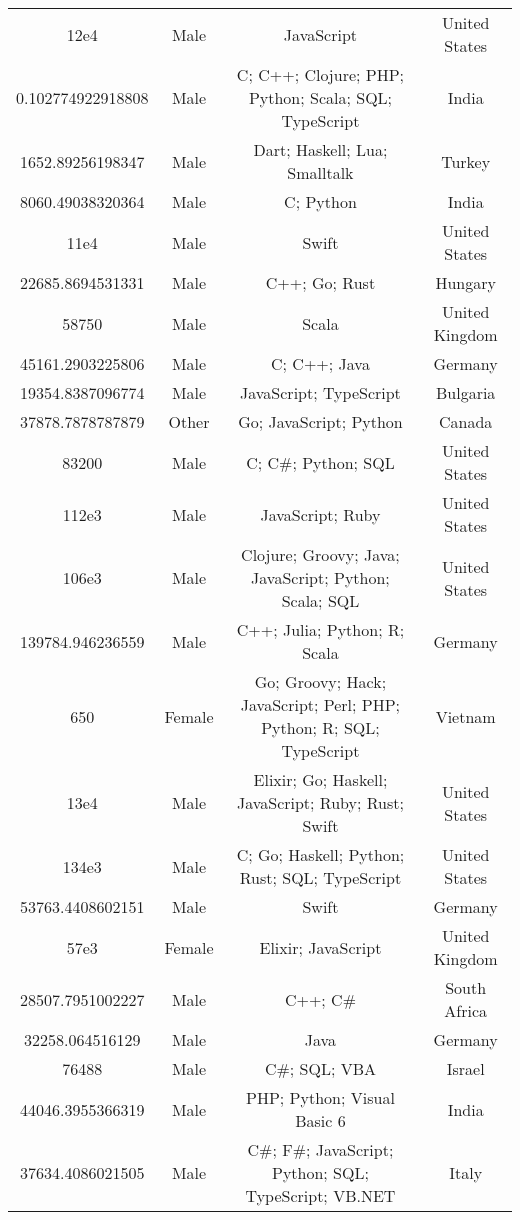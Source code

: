 \begin{center}
\begin{tabular}{ |c|c|c|c| }
12e4  &  Male  &  JavaScript  &  United States  \\ 
0.102774922918808  &  Male  &  C; C++; Clojure; PHP; Python; Scala; SQL; TypeScript  &  India  \\ 
1652.89256198347  &  Male  &  Dart; Haskell; Lua; Smalltalk  &  Turkey  \\ 
8060.49038320364  &  Male  &  C; Python  &  India  \\ 
11e4  &  Male  &  Swift  &  United States  \\ 
22685.8694531331  &  Male  &  C++; Go; Rust  &  Hungary  \\ 
58750  &  Male  &  Scala  &  United Kingdom  \\ 
45161.2903225806  &  Male  &  C; C++; Java  &  Germany  \\ 
19354.8387096774  &  Male  &  JavaScript; TypeScript  &  Bulgaria  \\ 
37878.7878787879  &  Other  &  Go; JavaScript; Python  &  Canada  \\ 
83200  &  Male  &  C; C\#; Python; SQL  &  United States  \\ 
112e3  &  Male  &  JavaScript; Ruby  &  United States  \\ 
106e3  &  Male  &  Clojure; Groovy; Java; JavaScript; Python; Scala; SQL  &  United States  \\ 
139784.946236559  &  Male  &  C++; Julia; Python; R; Scala  &  Germany  \\ 
650  &  Female  &  Go; Groovy; Hack; JavaScript; Perl; PHP; Python; R; SQL; TypeScript  &  Vietnam  \\ 
13e4  &  Male  &  Elixir; Go; Haskell; JavaScript; Ruby; Rust; Swift  &  United States  \\ 
134e3  &  Male  &  C; Go; Haskell; Python; Rust; SQL; TypeScript  &  United States  \\ 
53763.4408602151  &  Male  &  Swift  &  Germany  \\ 
57e3  &  Female  &  Elixir; JavaScript  &  United Kingdom  \\ 
28507.7951002227  &  Male  &  C++; C\#  &  South Africa  \\ 
32258.064516129  &  Male  &  Java  &  Germany  \\ 
76488  &  Male  &  C\#; SQL; VBA  &  Israel  \\ 
44046.3955366319  &  Male  &  PHP; Python; Visual Basic 6  &  India  \\ 
37634.4086021505  &  Male  &  C\#; F\#; JavaScript; Python; SQL; TypeScript; VB.NET  &  Italy  \\ 

\end{tabular}
\end{center}
